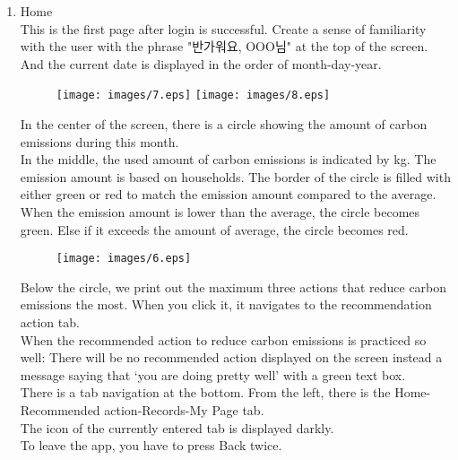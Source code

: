 \documentclass[11pt, conference]{IEEEtran}
\begin{document}
\begin{enumerate}[label=\arabic*]
    \item {\large{Home}}\\
    This is the first page after login is successful. Create a sense of familiarity with the user with the phrase "반가워요, OOO님" at the top of the screen. And the current date is displayed in the order of month-day-year.
    \begin{figure}[H]
            \centering
            \texttt{[image: images/7.eps]}
            \texttt{[image: images/8.eps]}
    \end{figure}
    In the center of the screen, there is a circle showing the amount of carbon emissions during this month.\\
    In the middle, the used amount of carbon emissions is indicated by kg. The emission amount is based on households. The border of the circle is filled with either green or red to match the emission amount compared to the average. When the emission amount is lower than the average, the circle becomes green. Else if it exceeds the amount of average, the circle becomes red. \\
    \begin{figure}[H]
            \centering
            \texttt{[image: images/6.eps]}
    \end{figure}
    Below the circle, we print out the maximum three actions that reduce carbon emissions the most. When you click it, it navigates to the recommendation action tab.\\
    When the recommended action to reduce carbon emissions is practiced so well: There will be no recommended action displayed on the screen instead a message saying that ‘you are doing pretty well’ with a green text box. \\
    There is a tab navigation at the bottom. From the left, there is the Home-Recommended action-Records-My Page tab.\\
    The icon of the currently entered tab is displayed darkly.\\
    To leave the app, you have to press Back twice.\\
    

\end{enumerate}
\end{document}
